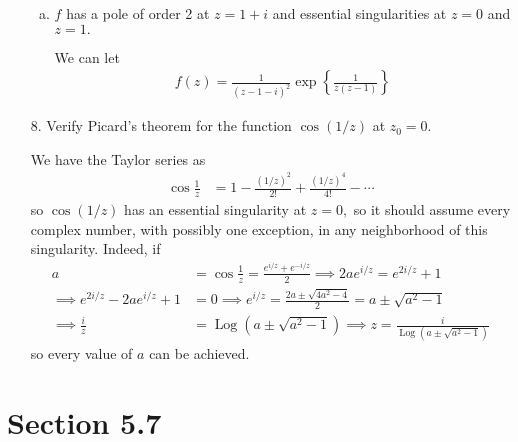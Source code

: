 \documentclass{article}
\DeclareMathOperator{\Log}{Log}
\begin{document}
\begin{itemize}
\begin{enumerate}[(a)]
			\item $f$ has a pole of order 2 at $z=1+i$ and essential singularities at $z=0$ and $z=1.$
				\begin{soln}
					We can let
					\begin{align*}
						f(z) = \frac{1}{(z-1-i)^2} \exp\left\{\frac{1}{z(z-1)}\right\}
					\end{align*}
				\end{soln}

		\end{enumerate}

	\item[8.] Verify Picard's theorem for the function $\cos(1/z)$ at $z_0=0.$
		\begin{soln}
			We have the Taylor series as
			\begin{align*}
				\cos \frac{1}{z} &= 1 - \frac{(1/z)^2}{2!} + \frac{(1/z)^4}{4!} - \cdots
			\end{align*}
			so $\cos (1/z)$ has an essential singularity at $z=0,$ so it should assume every complex number, with possibly one exception, in any neighborhood of this singularity. Indeed, if
			\begin{align*}
				a &= \cos \frac{1}{z} = \frac{e^{i/z} + e^{-i/z}}{2} \implies 2ae^{i/z} = e^{2i/z} + 1 \\
				\implies e^{2i/z} - 2ae^{i/z} + 1 &= 0 \implies e^{i/z} = \frac{2a \pm \sqrt{4a^2-4}}{2} = a\pm \sqrt{a^2-1} \\
				\implies \frac{i}{z} &= \Log\left( a\pm \sqrt{a^2-1} \right) \implies z = \frac{i}{\Log\left( a\pm \sqrt{a^2-1} \right)}
			\end{align*}
			so every value of $a$ can be achieved.
		\end{soln}

\end{itemize}

\section*{Section 5.7}
\end{document}
